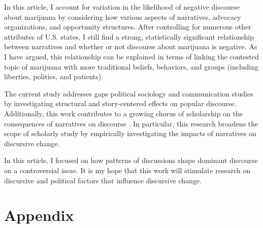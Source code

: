 In this article, I account for variation in the likelihood of negative discourse about marijuana by considering how various aspects of narratives, advocacy organizations, and opportunity structures. After controlling for numerous other attributes of U.S. states, I still find a strong, statistically significant relationship between narratives and whether or not discourse about marijuana is negative. As I have argued, this relationship can be explained in terms of linking the contested topic of marijuana with more traditional beliefs, behaviors, and groups (including liberties, politics, and patients). 

The current study addresses gaps political sociology and communication studies by investigating structural and story-centered effects on popular discourse. Additionally, this work contributes to a growing chorus of scholarship on the consequences of narratives on discourse \citep{bail_2012,bateman_et_al_2019}. In particular, this research broadens the scope of scholarly study by empirically investigating the impacts of narratives on discursive change. 

In this article, I focused on how patterns of discussions shape dominant discourse on a controversial issue. It is my hope that this work will stimulate research on discursive and political factors that influence discursive change.


%
%
\newpage



\section{Appendix}

%



%


